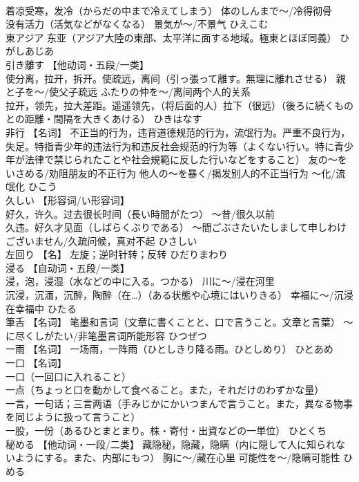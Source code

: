 \documentclass[8pt]{extreport}
\begin{document}
\begin{CJK}{UTF8}{min}
\\	着凉受寒，发冷（からだの中まで冷えてしまう） 体のしんまで～/冷得彻骨 
\\	没有活力（活気などがなくなる） 景気が～/不景气	ひえこむ	
\\	東アジア	东亚（アジア大陸の東部、太平洋に面する地域。極東とほぼ同義）	ひがしあじあ	
\\	引き離す	【他动词・五段/一类】 
\\	使分离，拉开，拆开。使疏远，离间（引っ張って離す。無理に離れさせる） 親と子を～/使父子疏远 ふたりの仲を～/离间两个人的关系 
\\	拉开，领先，拉大差距。遥遥领先，（将后面的人）拉下（很远）（後ろに続くものとの距離・間隔を大きくあける）	ひきはなす	
\\	非行	【名词】 不正当的行为，违背道德规范的行为，流氓行为。严重不良行为，失足。特指青少年的违法行为和违反社会规范的行为等（よくない行い。特に青少年が法律で禁じられたことや社会規範に反した行いなどをすること） 友の～をいさめる/劝阻朋友的不正行为 他人の～を暴く/揭发别人的不正当行为 ～化/流氓化	ひこう	
\\	久しい	【形容词/い形容词】 
\\	好久，许久。过去很长时间（長い時間がたつ） ～昔/很久以前 
\\	久违。好久才见面（しばらくぶりである） ～間ごぶさたいたしまして申しわけございません/久疏问候，真对不起	ひさしい	
\\	左回り	【名】 左旋；逆时针转；反转	ひだりまわり	
\\	浸る	【自动词・五段/一类】 
\\	浸，泡，浸湿（水などの中に入る。つかる） 川に～/浸在河里 
\\	沉浸，沉湎，沉醉，陶醉（在…）（ある状態や心境にはいりきる） 幸福に～/沉浸在幸福中	ひたる	
\\	筆舌	【名词】 笔墨和言词（文章に書くことと、口で言うこと。文章と言葉） ～に尽くしがたい/非笔墨言词所能形容	ひつぜつ	
\\	一雨	【名词】 一场雨，一阵雨（ひとしきり降る雨。ひとしめり）	ひとあめ	
\\	一口	【名词】 
\\	一口（一回口に入れること） 
\\	一点（ちょっと口を動かして食べること。また，それだけのわずかな量） 
\\	一言，一句话；三言两语（手みじかにかいつまんで言うこと。また，異なる物事を同じように扱って言うこと） 
\\	一股，一份（あるひとまとまり。株・寄付・出資などの一単位）	ひとくち	
\\	秘める	【他动词・一段/二类】 藏隐秘，隐藏，隐瞒（内に隠して人に知られないようにする。また、内部にもつ） 胸に～/藏在心里 可能性を～/隐瞒可能性	ひめる	

\end{CJK}
\end{document}
